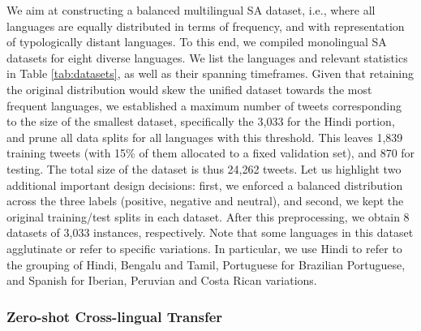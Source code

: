 \documentclass[10pt, a4paper]{article}
\begin{document}
\vspace{1ex plus 0.5ex}


We aim at constructing a balanced multilingual SA dataset, i.e., where all languages are equally distributed in terms of frequency, and with representation of typologically distant languages. To this end, we compiled monolingual SA datasets for eight diverse languages. We list the languages and relevant statistics in Table \ref{tab:datasets}, as well as their spanning timeframes. Given that retaining the original distribution would skew the unified dataset towards the most frequent languages, we established a maximum number of tweets corresponding to the size of the smallest dataset, specifically the 3,033 for the Hindi portion, and prune all data splits for all languages with this threshold. This leaves 1,839 training tweets (with 15\% of them allocated to a fixed validation set), and 870 for testing. The total size of the dataset is thus 24,262 tweets. Let us highlight two additional important design decisions: first, we enforced a balanced distribution across the three labels (positive, negative and neutral), and second, we kept the original training/test splits in each dataset. After this preprocessing, we obtain 8 datasets of 3,033 instances, respectively. Note that some languages in this dataset agglutinate or refer to specific variations. In particular, we use Hindi to refer to the grouping of Hindi, Bengalu and Tamil, Portuguese for Brazilian Portuguese, and Spanish for Iberian, Peruvian and Costa Rican variations. 






































\subsubsection{Zero-shot Cross-lingual Transfer}
\label{sec:zeroshot}
\end{document}
